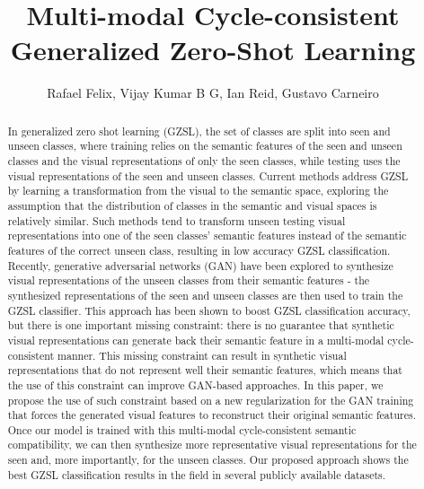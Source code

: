 \documentclass[runningheads]{llncs}
\begin{document}
\pagestyle{headings}
\mainmatter
\def\ECCV18SubNumber{2156}  %

\title{Multi-modal Cycle-consistent Generalized Zero-Shot Learning}



\author{Rafael Felix, Vijay Kumar B G, Ian Reid, Gustavo Carneiro}


\maketitle

\begin{abstract}
In generalized zero shot learning (GZSL), the set of classes are split into seen and unseen classes, where training relies on the semantic features of the seen and unseen classes and the visual representations of only the seen classes, while testing uses the visual representations of the seen and unseen classes.  Current methods address GZSL by learning a transformation from the visual to the semantic space, exploring the assumption that the distribution of classes in the semantic and visual spaces is relatively similar.  Such methods tend to transform unseen testing visual representations into one of the seen classes' semantic features instead of the semantic features of the correct unseen class, resulting in low accuracy GZSL classification.  Recently, generative adversarial networks (GAN) have been explored to synthesize visual representations of the unseen classes from their semantic features - the synthesized representations of the seen and unseen classes are then used to train the GZSL classifier.  This approach has been shown to boost GZSL classification accuracy, but there is one important missing constraint: there is no guarantee that synthetic visual representations can generate back their semantic feature in a multi-modal cycle-consistent manner.  This missing constraint can result in synthetic visual representations that do not represent well their semantic features, which means that the use of this constraint can improve GAN-based approaches. In this paper, we propose the use of such constraint based on a new regularization for the GAN training that forces the generated visual features to reconstruct their original semantic features. Once our model is trained with this multi-modal cycle-consistent semantic compatibility, we can then synthesize more representative visual representations for the seen and, more importantly, for the unseen classes.  Our proposed approach shows the best GZSL classification results in the field in several publicly available datasets.
\end{abstract}
\end{document}
